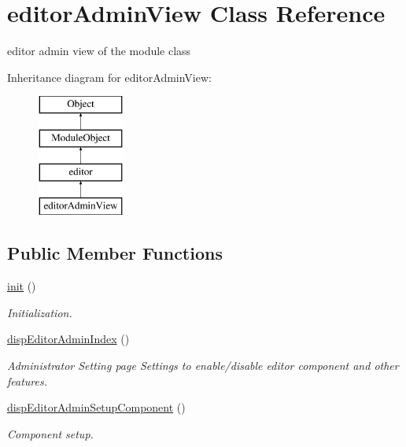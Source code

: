 \hypertarget{classeditorAdminView}{}\section{editor\+Admin\+View Class Reference}
\label{classeditorAdminView}


editor admin view of the module class  


Inheritance diagram for editor\+Admin\+View\+:\begin{figure}[H]
\begin{center}
\leavevmode
\includegraphics[height=4.000000cm]{classeditorAdminView}
\end{center}
\end{figure}
\subsection*{Public Member Functions}
\begin{DoxyCompactItemize}
\item 
\hyperlink{classeditorAdminView_a18af5d75c5a6fda358ddd301f99ef609}{init} ()
\begin{DoxyCompactList}\small\item\em Initialization. \end{DoxyCompactList}\item 
\hyperlink{classeditorAdminView_ae8fadbf37f9efc8389c45e7171eba8be}{disp\+Editor\+Admin\+Index} ()
\begin{DoxyCompactList}\small\item\em Administrator Setting page Settings to enable/disable editor component and other features. \end{DoxyCompactList}\item 
\hyperlink{classeditorAdminView_aeebafdbe84d4360ae45481f13981ca00}{disp\+Editor\+Admin\+Setup\+Component} ()
\begin{DoxyCompactList}\small\item\em Component setup. \end{DoxyCompactList}\end{DoxyCompactItemize}
